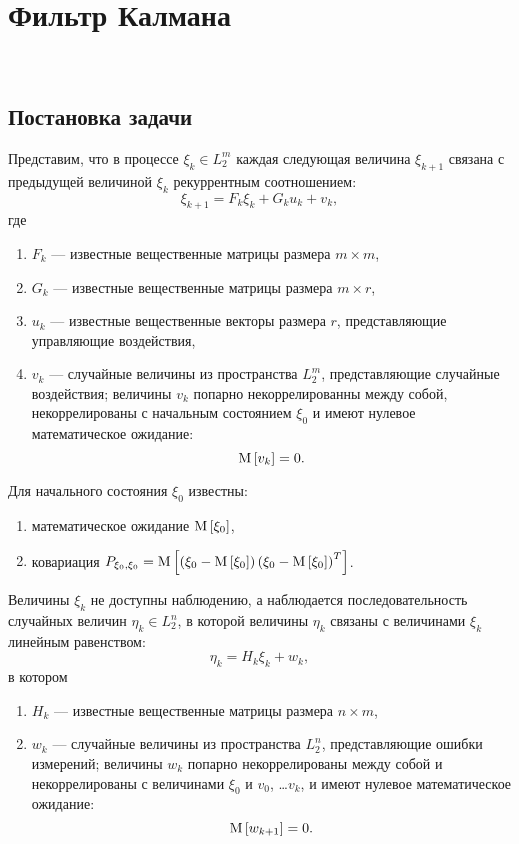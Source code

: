\section{Фильтр Калмана}~\label{section:filtering:in_states:kalman}

\subsection{Постановка задачи}

Представим, что в процессе $\xi_k \in L_2^m$ каждая следующая величина $\xi_{k+1}$ связана с предыдущей величиной $\xi_k$ рекуррентным соотношением:
\begin{equation} \label{equation:filtering:in_states:kalman:states}
	\xi_{k+1} = F_k \xi_k + G_k u_k + v_k ,
\end{equation}
где
\begin{enumerate}
	\item $F_k$ --- известные вещественные матрицы размера $m \times m$,
	\item $G_k$ --- известные вещественные матрицы размера $m \times r$,
	\item $u_k$ --- известные вещественные векторы размера $r$, представляющие управляющие воздействия,
	\item $v_k$ --- случайные величины из пространства $L_2^m$, представляющие случайные воздействия; величины $v_k$ попарно некоррелированны между собой,
		некоррелированы с начальным состоянием $\xi_0$ и имеют нулевое математическое ожидание:
		$$
			\mathrm{M} \left [ v_k \right ] = 0 .
		$$
\end{enumerate}

Для начального состояния $\xi_0$ известны:
\begin{enumerate}
	\item математическое ожидание $\mathrm{M} \left [ \xi_0 \right ]$,
	\item ковариация $P_{\xi_0, \xi_0} = \mathrm{M} \left [ \left ( \xi_0 - \mathrm{M} \left [ \xi_0 \right ] \right ) \left ( \xi_0 - \mathrm{M} \left [ \xi_0 \right ] \right )^T \right ]$.
\end{enumerate}

Величины $\xi_k$ не доступны наблюдению, а наблюдается последовательность случайных величин $\eta_k \in L_2^n$, в которой величины $\eta_k$ связаны с величинами $\xi_k$
линейным равенством:
\begin{equation} \label{equation:filtering:in_states:kalman:observations}
	\eta_k = H_k \xi_k + w_k ,
\end{equation}
в котором
\begin{enumerate}
	\item $H_k$ --- известные вещественные матрицы размера $n \times m$,
	\item $w_k$ --- случайные величины из пространства $L_2^n$, представляющие ошибки измерений; величины $w_k$ попарно некоррелированы между собой и некоррелированы
		с величинами $\xi_0$ и $v_0$, \dots $v_k$, и имеют нулевое математическое ожидание:
		$$
			\mathrm{M} \left [ w_{k+1} \right ] = 0 .
		$$
\end{enumerate}

